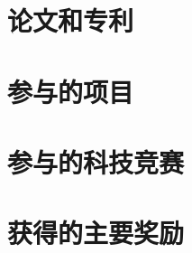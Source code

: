\begin{publication}
  \section*{论文和专利}

  \section*{参与的项目}


  \section*{参与的科技竞赛}


  \section*{获得的主要奖励}

\end{publication}
